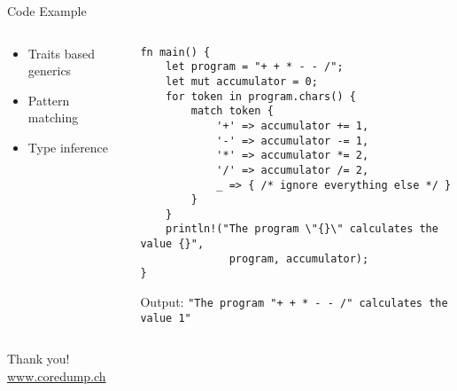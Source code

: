 \documentclass[aspectratio=1610,t]{beamer}
\begin{document}
\begin{frame}[c,fragile]{Code Example}
  \begin{columns}
    \begin{column}{.3\textwidth}
      \centering
      \begin{itemize}
        \item Traits based generics
        \item Pattern matching
        \item Type inference
      \end{itemize}
    \end{column}

    \begin{column}{.8\textwidth}
    \begin{verbatim}
fn main() {
    let program = "+ + * - - /";
    let mut accumulator = 0;
    for token in program.chars() {
        match token {
            '+' => accumulator += 1,
            '-' => accumulator -= 1,
            '*' => accumulator *= 2,
            '/' => accumulator /= 2,
            _ => { /* ignore everything else */ }
        }
    }
    println!("The program \"{}\" calculates the value {}",
              program, accumulator);
}
  \end{verbatim}
      Output: \texttt{"The program "+ + * - - /" calculates the value 1"}
  \end{column}
  \end{columns}
\end{frame}




{
\begin{frame}[standout]
  \begin{centering}
    {\Huge Thank you!}\\
    {\normalsize \url{www.coredump.ch}}\\
  \end{centering}
\end{frame}
}
\end{document}
